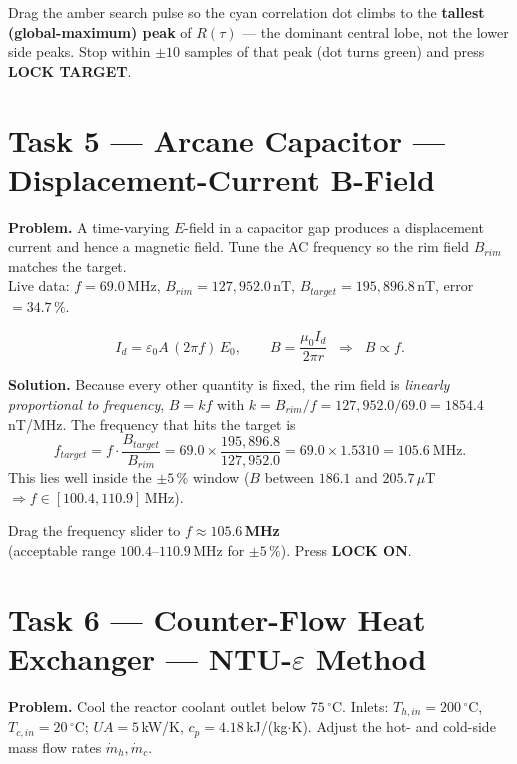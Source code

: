 \documentclass[11pt]{article}
\newcommand{\task}[2]{\section{Task #1 --- #2}}
\begin{document}
\begin{answer}
Drag the amber search pulse so the cyan correlation dot climbs to the
\textbf{tallest (global-maximum) peak} of $R(\tau)$ --- the dominant central
lobe, not the lower side peaks. Stop within $\pm10$ samples of that peak
(dot turns green) and press \textbf{LOCK TARGET}.
\end{answer}

\task{5}{Arcane Capacitor --- Displacement-Current B-Field}
\textbf{Problem.} A time-varying $E$-field in a capacitor gap produces a
displacement current and hence a magnetic field. Tune the AC frequency so the
rim field $B_{rim}$ matches the target.\\
Live data: $f=69.0$\,MHz, $B_{rim}=127{,}952.0$\,nT,
$B_{target}=195{,}896.8$\,nT, error $=34.7\,\%$.

\begin{relbox}
\[
I_d=\varepsilon_0 A\,(2\pi f)\,E_0,\qquad
B=\frac{\mu_0 I_d}{2\pi r}\;\;\Longrightarrow\;\; B\propto f .
\]
\end{relbox}

\textbf{Solution.} Because every other quantity is fixed, the rim field is
\emph{linearly proportional to frequency}, $B=k f$ with
$k=B_{rim}/f=127{,}952.0/69.0=1854.4$\,nT/MHz. The frequency that hits the
target is
\[
f_{target}=f\cdot\frac{B_{target}}{B_{rim}}
=69.0\times\frac{195{,}896.8}{127{,}952.0}
=69.0\times1.5310=105.6\ \text{MHz}.
\]
This lies well inside the $\pm5\,\%$ window
($B$ between $186.1$ and $205.7\,\mu$T $\Rightarrow f\in[100.4,110.9]$\,MHz).

\begin{answer}
Drag the frequency slider to \textbf{$f \approx 105.6$\,MHz}\\
(acceptable range $100.4$--$110.9$\,MHz for $\pm5\,\%$). Press \textbf{LOCK ON}.
\end{answer}

\task{6}{Counter-Flow Heat Exchanger --- NTU-$\varepsilon$ Method}
\textbf{Problem.} Cool the reactor coolant outlet below $75\,^{\circ}$C.
Inlets: $T_{h,in}=200\,^{\circ}$C, $T_{c,in}=20\,^{\circ}$C;
$UA=5$\,kW/K, $c_p=4.18$\,kJ/(kg$\cdot$K). Adjust the hot- and cold-side
mass flow rates $\dot m_h,\dot m_c$.
\end{document}
